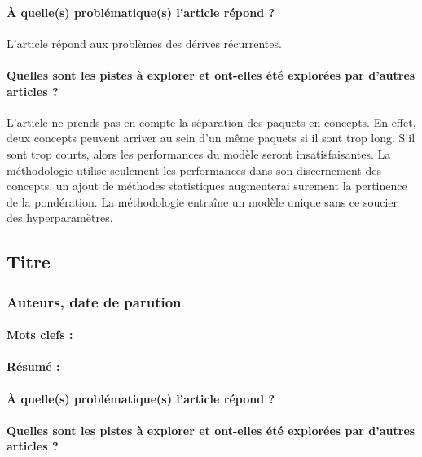 \documentclass[11pt,a4paper]{report}
\begin{document}
\paragraph{À quelle(s) problématique(s) l'article répond ?} L'article répond aux problèmes des dérives récurrentes.

\paragraph{Quelles sont les pistes à explorer et ont-elles été explorées par d'autres articles ?} L'article ne prends pas en compte la séparation des paquets en concepts. En effet, deux concepts peuvent arriver au sein d'un même paquets si il sont trop long. S'il sont trop courts, alors les performances du modèle seront insatisfaisantes. La méthodologie utilise seulement les performances dans son discernement des concepts, un ajout de méthodes statistiques augmenterai surement la pertinence de la pondération. La méthodologie entraîne un modèle unique sans ce soucier des hyperparamètres.







\subsection{Titre}
\subsubsection{Auteurs, date de parution}

\paragraph{Mots clefs :}

\paragraph{Résumé :}

\paragraph{À quelle(s) problématique(s) l'article répond ?}

\paragraph{Quelles sont les pistes à explorer et ont-elles  été explorées par d'autres articles ?}
\end{document}
